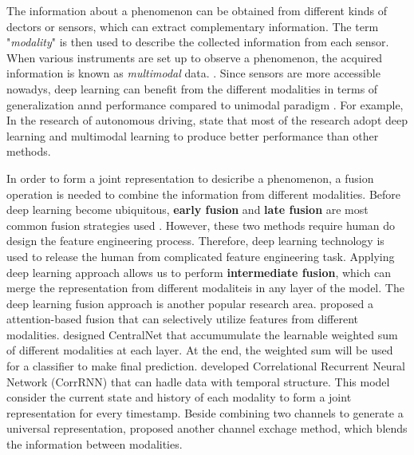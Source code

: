 The information about a phenomenon can be obtained from different kinds of dectors or sensors, which can extract complementary information. The term "\textit{modality}" is then used to describe the collected information from each sensor. When various instruments are set up to observe a phenomenon, the acquired information is known as \textit{multimodal} data. \citep{Lahat2015MultiModalDataFusion, Ramachandram2017DeepMultiModalSurvey}. Since sensors are more accessible nowadys, deep learning can benefit from the different modalities in terms of generalization annd performance compared to unimodal paradigm \citep{Wang2020DeepMultimodal}. For example, In the research of autonomous driving, \citep{Feng2021MultiModalAutonomousDriving} state that most of the research adopt deep learning and multimodal learning to produce better performance than other methods.

In order to form a joint representation to desicribe a phenomenon, a fusion operation is needed to combine the information from different modalities. Before deep learning become ubiquitous, \textbf{early fusion} and \textbf{late fusion} are most common fusion strategies used  . However, these two methods require human do design the feature engineering process. Therefore, deep learning technology is used to release the human from complicated feature engineering task. Applying deep learning approach allows us to perform \textbf{intermediate fusion}, which can merge the representation from different modaliteis in any layer of the model. The deep learning fusion approach is another popular research area. \citet{Hori2017AttentionBasedFusion} proposed a attention-based fusion that can selectively utilize features from different modalities. \citet{Vielzeuf2018CentralNet} designed CentralNet that accumumulate the learnable weighted sum of different modalities at each layer. At the end, the weighted sum will be used for a classifier to make final prediction. \citet{Yang2017MutiModalTemporalData} developed Correlational Recurrent Neural Network (CorrRNN) that can hadle data with temporal structure. This model consider the current state and history of each modality to form a joint representation for every timestamp. Beside combining two channels to generate a universal representation, \citep{Wang2020ChannelExchange} proposed another channel exchage method, which blends the information between modalities.

